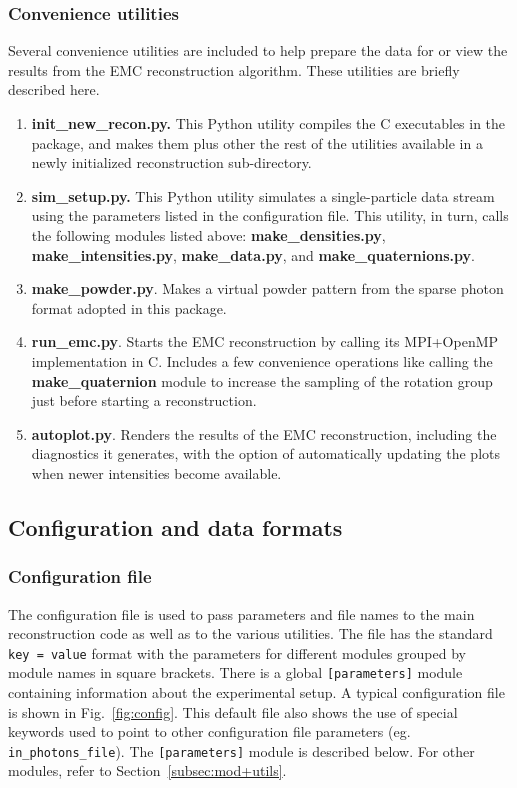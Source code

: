 \documentclass[]{iucr}              %
\begin{document}
\subsubsection{Convenience utilities}
Several convenience utilities are included to help prepare the data for or view the results from the EMC reconstruction algorithm. These utilities are briefly described here. 
\begin{enumerate}
\item{\bf init\_new\_recon.py.} This Python utility compiles the C executables in the package, and makes them plus other the rest of the utilities available in a newly initialized reconstruction sub-directory.
\item{\bf sim\_setup.py.} This Python utility simulates a single-particle data stream using the parameters listed in the configuration file. This utility, in turn, calls the following modules listed above: {\bf make\_densities.py}, {\bf make\_intensities.py}, {\bf make\_data.py}, and {\bf make\_quaternions.py}.
\item{\bf make\_powder.py}. Makes a virtual powder pattern from the sparse photon format adopted in this package.
\item{\bf run\_emc.py}. Starts the EMC reconstruction by calling its MPI+OpenMP implementation in C. Includes a few convenience operations like calling the {\bf make\_quaternion} module to increase the sampling of the rotation group just before starting a reconstruction.
\item{\bf autoplot.py}. Renders the results of the EMC reconstruction, including the diagnostics it generates, with the option of automatically updating the plots when newer intensities become available.
\end{enumerate}


\subsection{Configuration and data formats}
\label{subsec:formats}
\subsubsection{Configuration file}
\label{subsec:config}
The configuration file is used to pass parameters and file names to the main reconstruction code as well as to the various utilities. The file has the standard \texttt{key = value} format with the parameters for different modules grouped by module names in square brackets. There is a global \texttt{[parameters]} module containing information about the experimental setup. A typical configuration file is shown in Fig.~\ref{fig:config}. This default file also shows the use of special keywords used to point to other configuration file parameters (eg. \texttt{in\_photons\_file}). The \texttt{[parameters]} module is described below. For other modules, refer to Section~\ref{subsec:mod+utils}.
\end{document}
